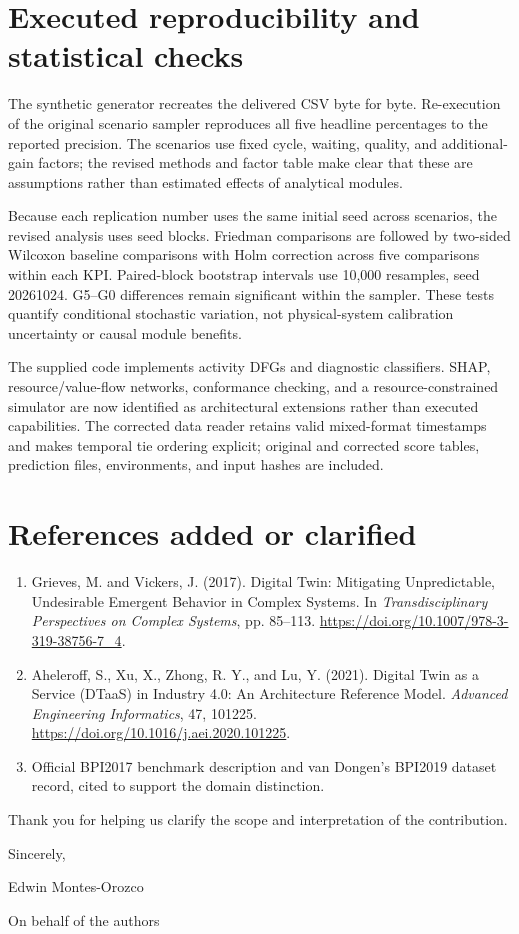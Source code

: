 \documentclass[11pt,a4paper]{article}
\begin{document}
\section*{Executed reproducibility and statistical checks}
The synthetic generator recreates the delivered CSV byte for byte. Re-execution of the original scenario sampler reproduces all five headline percentages to the reported precision. The scenarios use fixed cycle, waiting, quality, and additional-gain factors; the revised methods and factor table make clear that these are assumptions rather than estimated effects of analytical modules.

Because each replication number uses the same initial seed across scenarios, the revised analysis uses seed blocks. Friedman comparisons are followed by two-sided Wilcoxon baseline comparisons with Holm correction across five comparisons within each KPI. Paired-block bootstrap intervals use 10,000 resamples, seed 20261024. G5--G0 differences remain significant within the sampler. These tests quantify conditional stochastic variation, not physical-system calibration uncertainty or causal module benefits.

The supplied code implements activity DFGs and diagnostic classifiers. SHAP, resource/value-flow networks, conformance checking, and a resource-constrained simulator are now identified as architectural extensions rather than executed capabilities. The corrected data reader retains valid mixed-format timestamps and makes temporal tie ordering explicit; original and corrected score tables, prediction files, environments, and input hashes are included.

\section*{References added or clarified}
\begin{enumerate}[leftmargin=*,itemsep=5pt]
\item Grieves, M. and Vickers, J. (2017). Digital Twin: Mitigating Unpredictable, Undesirable Emergent Behavior in Complex Systems. In \textit{Transdisciplinary Perspectives on Complex Systems}, pp. 85--113. \url{https://doi.org/10.1007/978-3-319-38756-7_4}.
\item Aheleroff, S., Xu, X., Zhong, R. Y., and Lu, Y. (2021). Digital Twin as a Service (DTaaS) in Industry 4.0: An Architecture Reference Model. \textit{Advanced Engineering Informatics}, 47, 101225. \url{https://doi.org/10.1016/j.aei.2020.101225}.
\item Official BPI2017 benchmark description and van Dongen's BPI2019 dataset record, cited to support the domain distinction.
\end{enumerate}
Thank you for helping us clarify the scope and interpretation of the contribution.

Sincerely,\par Edwin Montes-Orozco\par On behalf of the authors
\end{document}
